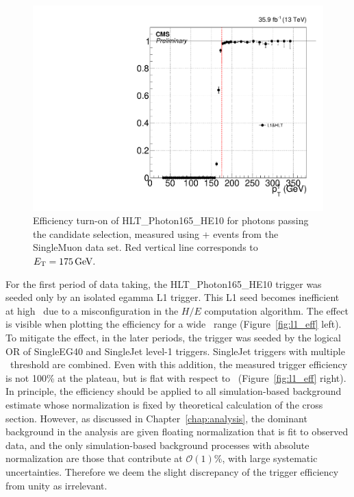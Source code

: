 \begin{figure}[htbp]
  \centering
  \includegraphics[width=0.48\linewidth]{Calibration/Figures/photon_elmu_sph165abs_ptzoom.pdf}
  \caption{
    Efficiency turn-on of HLT\_Photon165\_HE10 for photons passing the candidate selection, measured using \Pgm + \egamma events from the SingleMuon data set. 
    Red vertical line corresponds to $E_{\mathrm{T}} = 175\,\text{Ge\hspace{-.08em}V}.$
  }
  \label{fig:hlt_eff}
\end{figure}

For the first period of data taking, the HLT\_Photon165\_HE10 trigger was seeded only by an isolated egamma L1 trigger. 
This L1 seed becomes inefficient at high \ET\ due to a misconfiguration in the $H/E$ computation algorithm. 
The effect is visible when plotting the efficiency for a wide \ET\ range (Figure~\ref{fig:l1_eff} left). 
To mitigate the effect, in the later periods, the trigger was seeded by the logical OR of SingleEG40 and SingleJet level-1 triggers. 
SingleJet triggers with multiple \pt\ threshold are combined. 
Even with this addition, the measured trigger efficiency is not 100\% at the plateau, but is flat with respect to \ET\ (Figure~\ref{fig:l1_eff} right). 
In principle, the efficiency should be applied to all simulation-based background estimate whose normalization is fixed by theoretical calculation of the cross section. However, as discussed in Chapter~\ref{chap:analysis}, the dominant background in the analysis are given floating normalization that is fit to observed data, and the only simulation-based background processes with absolute normalization are those that contribute at $\mathcal{O}(1)$\%, with large systematic uncertainties. 
Therefore we deem the slight discrepancy of the trigger efficiency from unity as irrelevant.

